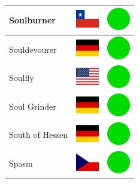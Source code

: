 \documentclass[12pt, a4paper, twoside]{report}
\begin{document}
\begin{center}
\begin{longtable}{|p{5cm}|p{2cm}|p{2cm}|}
 Soulburner                                                 & \includegraphics[width=1cm]{../4x3/cl} &   \includegraphics[width=1cm]{../likes/y} \\ \hline
 Souldevourer                                               & \includegraphics[width=1cm]{../4x3/de} &   \includegraphics[width=1cm]{../likes/y} \\ \hline
 Soulfly                                                    & \includegraphics[width=1cm]{../4x3/us} &   \includegraphics[width=1cm]{../likes/y} \\ \hline
 Soul Grinder                                               & \includegraphics[width=1cm]{../4x3/de} &   \includegraphics[width=1cm]{../likes/y} \\ \hline
 South of Hessen                                            & \includegraphics[width=1cm]{../4x3/de} &   \includegraphics[width=1cm]{../likes/y} \\ \hline
 Spasm                                                      & \includegraphics[width=1cm]{../4x3/cz} &   \includegraphics[width=1cm]{../likes/y} \\ \hline

\end{longtable}
\end{center}
\end{document}
